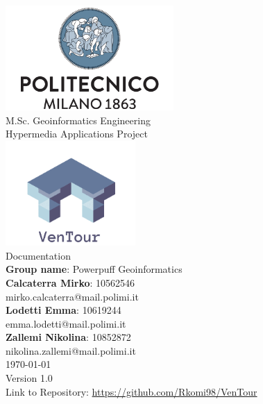 \documentclass[12pt]{article}
\begin{document}
	\begin{titlepage}
		\centering
		\vfill
		{
			\includegraphics[width =\linewidth, height = 4cm, keepaspectratio]{PolitecnicoLogo.png}
			\label{fig:PolitecnicoLogo}
			\large \\[2ex]M.Sc. Geoinformatics Engineering\\
			\large Hypermedia Applications Project\\[9ex]
			\includegraphics[width =\linewidth, height = 4cm, keepaspectratio]{Images/VentourLogo.png}\\[9ex]

			\huge Documentation\\[3ex]

            \normalsize \textbf{Group name}: Powerpuff Geoinformatics\\[2.5ex]

			\normalsize \textbf{Calcaterra Mirko}: 10562546\\[0.5ex]
			\normalsize mirko.calcaterra@mail.polimi.it\\[1.5ex]
			\normalsize \textbf{Lodetti Emma}: 10619244\\[0.5ex]
			\normalsize emma.lodetti@mail.polimi.it\\[1.5ex]
            \normalsize \textbf{Zallemi Nikolina}: 10852872\\[0.5ex]
			\normalsize nikolina.zallemi@mail.polimi.it\\[1.5ex]
			\normalsize \today\\[1.5ex]
			\normalsize Version 1.0\\[1.5ex]
   \normalsize Link to Repository: \url{https://github.com/Rkomi98/VenTour}
		}

	\end{titlepage}
\end{document}
